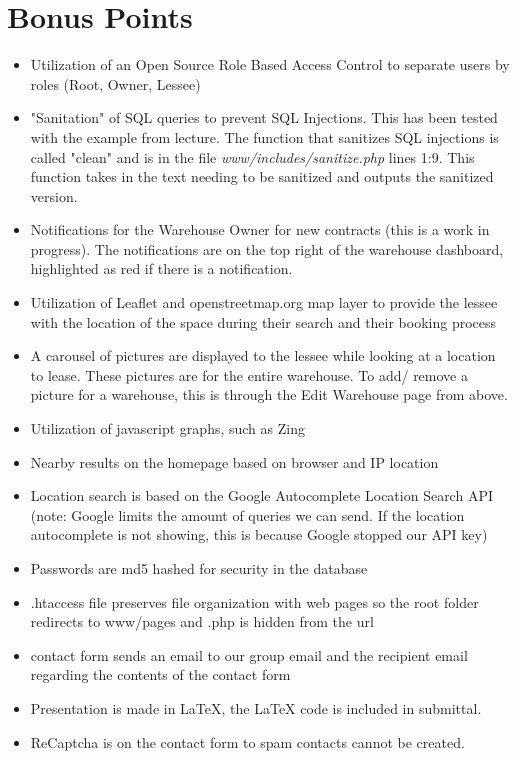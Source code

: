 \section*{Bonus Points}
\begin{itemize}
\item Utilization of an Open Source Role Based Access Control \cite{abiusx} to separate users by roles (Root, Owner, Lessee)
\item "Sanitation" of SQL queries to prevent SQL Injections.  This has been tested with the example from lecture.  The function that sanitizes SQL injections is called "clean" and is in the file \textit{www/includes/sanitize.php} lines 1:9.  This function takes in the text needing to be sanitized and outputs the sanitized version.
\item Notifications for the Warehouse Owner for new contracts (this is a work in progress).  The notifications are on the top right of the warehouse dashboard, highlighted as red if there is a notification.
\item Utilization of Leaflet and openstreetmap.org map layer to provide the lessee with the location of the space during their search and their booking process
\item A carousel of pictures are displayed to the lessee while looking at a location to lease.  These pictures are for the entire warehouse.  To add/ remove a picture for a warehouse, this is through the Edit Warehouse page from above.
\item Utilization of javascript graphs, such as Zing 
\item Nearby results on the homepage based on browser and IP location
\item Location search is based on the Google Autocomplete Location Search API (note: Google limits the amount of queries we can send.  If the location autocomplete is not showing, this is because Google stopped our API key)
\item Passwords are md5 hashed for security in the database
\item .htaccess file preserves file organization with web pages so the root folder redirects to www/pages and .php is hidden from the url
\item contact form sends an email to our group email and the recipient email regarding the contents of the contact form
\item Presentation is made in LaTeX, the LaTeX code is included in submittal.
\item ReCaptcha is on the contact form to spam contacts cannot be created.

\end{itemize}
